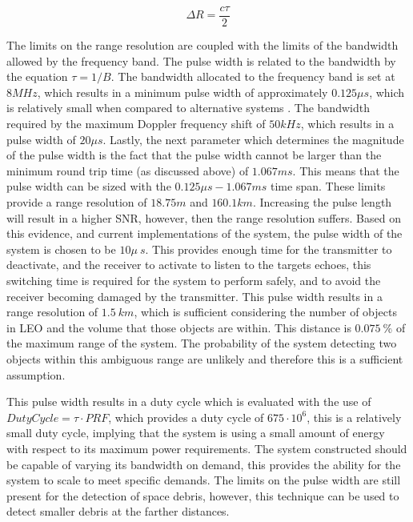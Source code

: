 \documentclass[11pt]{witseiepaper}
\begin{document}
\begin{equation} \label{eqn:RangeResolution}
\Delta R = \frac{c \tau}{2}
\end{equation}

The limits on the range resolution are coupled with the limits of the bandwidth allowed by the frequency band. The pulse width is related to the bandwidth by the equation $\tau = 1/ B$.
The bandwidth allocated to the frequency band is set at $8 MHz$, which results in a minimum pulse width of approximately $0.125 \mu s$, which is relatively small when compared to alternative systems \cite{AMISR, EISCAT, SIMO, telescope, BeamForming, OrbitDetermination, PlanarArray}. The bandwidth required by the maximum Doppler frequency shift of $50 kHz$, which results in a pulse width of $20 \mu s$.
Lastly, the next parameter which determines the magnitude of the pulse width is the fact that the pulse width cannot be larger than the minimum round trip time (as discussed above) of $1.067 ms$. 
This means that the pulse width can be sized with the $0.125 \mu s - 1.067 ms$ time span.
These limits provide a range resolution of $18.75 m$ and $160.1 km$. Increasing the pulse length will result in a higher SNR, however, then the range resolution suffers.
Based on this evidence, and current implementations of the system, the pulse width of the system is chosen to be $10\mu~s$. This provides enough time for the transmitter to deactivate, and the receiver to activate to listen to the targets echoes, this switching time is required for the system to perform safely, and to avoid the receiver becoming damaged by the transmitter.
This pulse width results in a range resolution of $1.5~km$, which is sufficient considering the number of objects in LEO and the volume that those objects are within. This distance is $0.075~\%$ of the maximum range of the system. The probability of the system detecting two objects within this ambiguous range are unlikely and therefore this is a sufficient assumption.

This pulse width results in a duty cycle which is evaluated with the use of $Duty Cycle = \tau \cdot PRF$, which provides a duty cycle of $675 \cdot 10^{6}$, this is a relatively small duty cycle, implying that the system is using a small amount of energy with respect to its maximum power requirements.
The system constructed should be capable of varying its bandwidth on demand, this provides the ability for the system to scale to meet specific demands. The limits on the pulse width are still present for the detection of space debris, however, this technique can be used to detect smaller debris at the farther distances.
\end{document}
